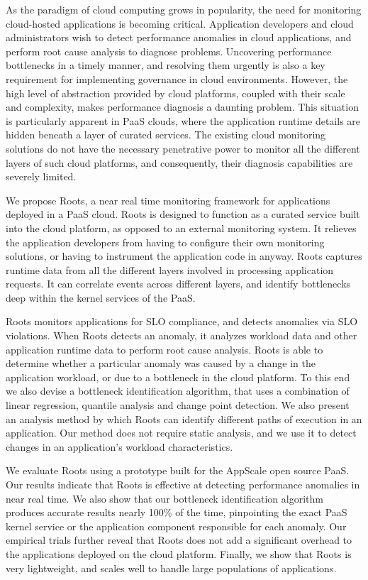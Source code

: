 As the paradigm of cloud computing grows in popularity, the need for monitoring cloud-hosted 
applications is becoming critical. Application developers and cloud administrators
wish to detect performance anomalies in cloud applications, and
perform root cause analysis to diagnose problems. Uncovering performance bottlenecks in a timely manner,
and resolving them urgently is also a key requirement for implementing governance in cloud
environments. However, the high level of abstraction provided by cloud
platforms, coupled with their scale and complexity, makes performance diagnosis
a daunting problem. This situation is particularly apparent in
PaaS clouds, where the application runtime details are hidden beneath a layer of curated services.
The existing cloud monitoring solutions do not have the necessary penetrative power
to monitor all the different layers of such cloud platforms, and consequently, their diagnosis
capabilities are severely limited.

We propose Roots, a near real time monitoring framework for applications deployed in a PaaS cloud. 
Roots is designed to function as a curated service
built into the cloud platform, as opposed to an external monitoring system. 
It relieves the application developers from having to configure
their own monitoring solutions, or having to instrument the application code in anyway.
Roots captures runtime data from all the different layers involved
in processing application requests. It can correlate events across different layers, and
identify bottlenecks deep within the kernel services of the PaaS.

Roots monitors applications for SLO compliance, and detects anomalies via SLO violations.
When Roots detects an anomaly, 
it analyzes workload data and other application runtime data
to perform root cause analysis. Roots is able to determine whether a particular
anomaly was caused by a change in the application workload, or due to a bottleneck
in the cloud platform. To this end we also devise a bottleneck identification algorithm, that
uses a combination of linear regression, quantile analysis and change point detection. 
We also present an analysis method by which Roots can identify different paths of execution
in an application. Our method does not require static analysis, and we use it to detect
changes in an application's workload characteristics.

We evaluate Roots using a prototype built for the AppScale open source PaaS. 
Our results indicate that Roots is effective at detecting performance anomalies
in near real time. We also show that our bottleneck identification algorithm
produces accurate results nearly 100\% of the time, pinpointing the exact PaaS kernel
service or the application component responsible for each anomaly. Our empirical trials further 
reveal that Roots does not add a significant overhead to the applications deployed
on the cloud platform. Finally, we show that Roots is very lightweight, 
and scales well to handle large populations of applications.

